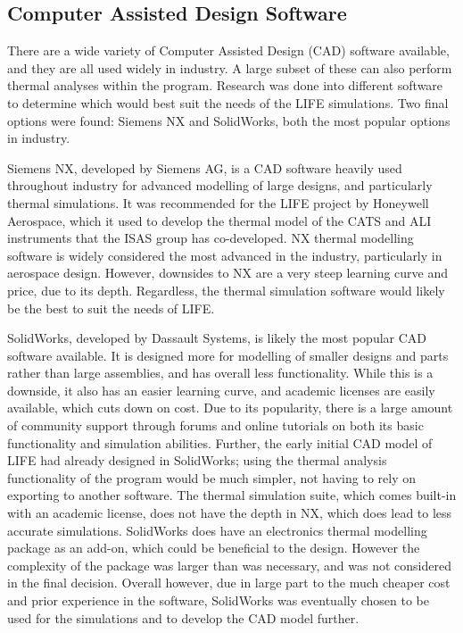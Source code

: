 \subsection{Computer Assisted Design Software}
There are a wide variety of Computer Assisted Design (CAD) software available, and they are all used widely in industry. A large subset of these can also perform thermal analyses within the program. Research was done into different software to determine which would best suit the needs of the LIFE simulations. Two final options were found: Siemens NX and SolidWorks, both the most popular options in industry.

Siemens NX, developed by Siemens AG, is a CAD software heavily used throughout industry for advanced modelling of large designs, and particularly thermal simulations. It was recommended for the LIFE project by Honeywell Aerospace, which it used to develop the thermal model of the CATS and ALI instruments that the ISAS group has co-developed. NX thermal modelling software is widely considered the most advanced in the industry, particularly in aerospace design. However, downsides to NX are a very steep learning curve and price, due to its depth. Regardless, the thermal simulation software would likely be the best to suit the needs of LIFE.

SolidWorks, developed by Dassault Systems, is likely the most popular CAD software available. It is designed more for modelling of smaller designs and parts rather than large assemblies, and has overall less functionality. While this is a downside, it also has an easier learning curve, and academic licenses are easily available, which cuts down on cost. Due to its popularity, there is a large amount of community support through forums and online tutorials on both its basic functionality and simulation abilities. Further, the early initial CAD model of LIFE had already designed in SolidWorks; using the thermal analysis functionality of the program would be much simpler, not having to rely on exporting to another software. The thermal simulation suite, which comes built-in with an academic license, does not have the depth in NX, which does lead to less accurate simulations. SolidWorks does have an electronics thermal modelling package as an add-on, which could be beneficial to the design. However the complexity of the package was larger than was necessary, and was not considered in the final decision. Overall however, due in large part to the much cheaper cost and prior experience in the software, SolidWorks was eventually chosen to be used for the simulations and to develop the CAD model further. 

